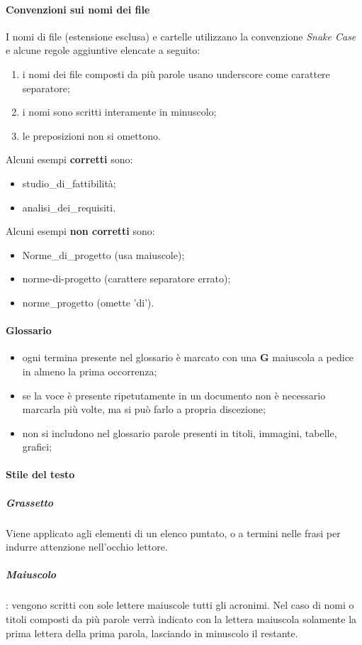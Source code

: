		\paragraph{Convenzioni sui nomi dei file}
		I nomi di file (estensione esclusa) e cartelle utilizzano la convenzione \textit{Snake Case} e alcune regole aggiuntive elencate a seguito:
		\begin{enumerate}
			\item i nomi dei file composti da più parole usano underscore come carattere separatore;
			\item i nomi sono scritti interamente in minuscolo;
			\item le preposizioni non si omettono.
		\end{enumerate}
		Alcuni esempi \textbf{corretti} sono:
		\begin{itemize}
			\item studio\_di\_fattibilità;
			\item analisi\_dei\_requisiti.
		\end{itemize}	 	
		Alcuni esempi \textbf{non corretti} sono: 
		\begin{itemize}
			\item Norme\_di\_progetto (usa maiuscole);
			\item norme-di-progetto (carattere separatore errato);
			\item norme\_progetto (omette 'di').
		\end{itemize}
		\paragraph{Glossario}
		\begin{itemize}
			\item ogni termina presente nel glossario è marcato con una \textbf{G} maiuscola a pedice in almeno la prima occorrenza;
			\item se la voce è presente ripetutamente in un documento non è necessario marcarla più volte, ma si può farlo a propria discezione; 
			\item non si includono nel glossario parole presenti in titoli, immagini, tabelle, grafici;
		\end{itemize}			
		\paragraph{Stile del testo}
			\subparagraph{Grassetto}
			Viene applicato agli elementi di un elenco puntato, o a termini nelle frasi per indurre attenzione nell'occhio lettore.
			\subparagraph{Maiuscolo}: vengono scritti con sole lettere maiuscole tutti gli acronimi. Nel caso di nomi o titoli composti da più parole verrà indicato con la lettera maiuscola solamente la prima lettera della prima parola, lasciando in minuscolo il restante.	
